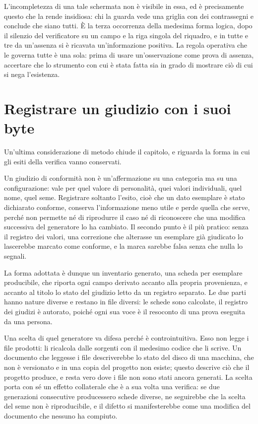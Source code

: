 L'incompletezza di una tale schermata non è visibile in essa, ed è precisamente questo che la rende insidiosa: chi la guarda vede una griglia con dei contrassegni e conclude che siano tutti. È la terza occorrenza della medesima forma logica, dopo il silenzio del verificatore su un campo e la riga singola del riquadro, e in tutte e tre da un'assenza si è ricavata un'informazione positiva. La regola operativa che le governa tutte è una sola: prima di usare un'osservazione come prova di assenza, accertare che lo strumento con cui è stata fatta sia in grado di mostrare ciò di cui si nega l'esistenza.

\section{Registrare un giudizio con i suoi byte}

Un'ultima considerazione di metodo chiude il capitolo, e riguarda la forma in cui gli esiti della verifica vanno conservati.

Un giudizio di conformità non è un'affermazione su una categoria ma su una configurazione: vale per quel valore di personalità, quei valori individuali, quel nome, quel seme. Registrare soltanto l'esito, cioè che un dato esemplare è stato dichiarato conforme, conserva l'informazione meno utile e perde quella che serve, perché non permette né di riprodurre il caso né di riconoscere che una modifica successiva del generatore lo ha cambiato. Il secondo punto è il più pratico: senza il registro dei valori, una correzione che alterasse un esemplare già giudicato lo lascerebbe marcato come conforme, e la marca sarebbe falsa senza che nulla lo segnali.

La forma adottata è dunque un inventario generato, una scheda per esemplare producibile, che riporta ogni campo derivato accanto alla propria provenienza, e accanto al titolo lo stato del giudizio letto da un registro separato. Le due parti hanno nature diverse e restano in file diversi: le schede sono calcolate, il registro dei giudizi è autorato, poiché ogni sua voce è il resoconto di una prova eseguita da una persona.

Una scelta di quel generatore va difesa perché è controintuitiva. Esso non legge i file prodotti: li ricalcola dalle sorgenti con il medesimo codice che li scrive. Un documento che leggesse i file descriverebbe lo stato del disco di una macchina, che non è versionato e in una copia del progetto non esiste; questo descrive ciò che il progetto produce, e resta vero dove i file non sono stati ancora generati. La scelta porta con sé un effetto collaterale che è a sua volta una verifica: se due generazioni consecutive producessero schede diverse, ne seguirebbe che la scelta del seme non è riproducibile, e il difetto si manifesterebbe come una modifica del documento che nessuno ha compiuto.
